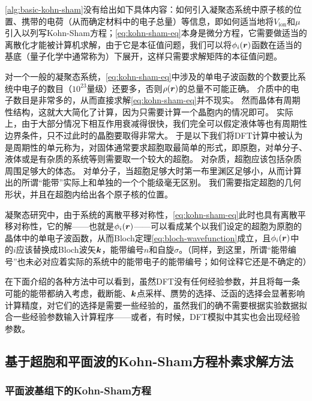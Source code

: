 \autoref{alg:basic-kohn-sham}没有给出如下具体内容：如何引入凝聚态系统中原子核的位置、携带的电荷（从而确定材料中的电子总量）等信息，即如何适当地将$V_\text{ion}$和$\mu$引入以列写Kohn-Sham方程；\eqref{eq:kohn-sham-eq}本身是微分方程，它需要做适当的离散化才能被计算机求解，由于它是本征值问题，我们可以将$\phi_i(\vb*{r})$函数在适当的基底（量子化学中通常称为）下展开，这样只需要求解矩阵的本征值问题。

对一个一般的凝聚态系统，\eqref{eq:kohn-sham-eq}中涉及的单电子波函数的个数要比系统中电子的数目（$10^{23}$量级）还要多，否则$\rho(\vb*{r})$的总量不可能正确。
介质中的电子数目是非常多的，从而直接求解\eqref{eq:kohn-sham-eq}并不现实。
然而晶体有周期性结构，这就大大简化了计算，因为只需要计算一个晶胞内的情况即可。
实际上，由于大部分情况下相互作用衰减得很快，我们完全可以假定液体等也有周期性边界条件，只不过此时的晶胞要取得非常大。
于是以下我们将DFT计算中被认为是周期性的单元称为，对固体通常要求超胞取最简单的形式，即原胞，对单分子、液体或是有杂质的系统等则需要取一个较大的超胞。
对杂质，超胞应该包括杂质周围足够大的体态。
对单分子，当超胞足够大时第一布里渊区足够小，从而计算出的所谓“能带”实际上和单独的一个个能级毫无区别。
我们需要指定超胞的几何形状，并且在超胞内给出各个原子核的位置。

凝聚态研究中，由于系统的离散平移对称性，\eqref{eq:kohn-sham-eq}此时也具有离散平移对称性，它的解——也就是$\phi_i(\vb*{r})$——可以看成某个以我们设定的超胞为原胞的晶体中的单电子波函数，从而Bloch定理\eqref{eq:bloch-wavefunction}成立，且$\phi_i(\vb*{r})$中的$i$应该替换成Bloch波矢$\vb*{k}$，能带编号$n$和自旋$\sigma$。（同样，到这里，所谓“能带编号”也未必对应着实际的系统中的能带电子的能带编号；如何诠释它还是不确定的）

在下面介绍的各种方法中可以看到，虽然DFT没有任何经验参数，并且将每一条可能的能带都纳入考虑，截断能、$\vb*{k}$点采样、赝势的选择、泛函的选择会显著影响计算精度，对它们的选择是需要一些经验的，虽然我们的确不需要根据实验数据拟合一些经验参数输入计算程序——或者，有时候，DFT模拟中其实也会出现经验参数。

\subsection{基于超胞和平面波的Kohn-Sham方程朴素求解方法}\label{sec:supercell-pwdft}

\subsubsection{平面波基组下的Kohn-Sham方程}

